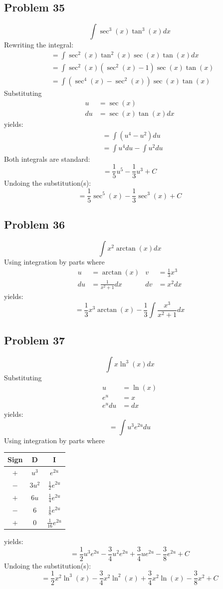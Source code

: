 \documentclass{article}
\begin{document}
\subsection*{Problem 35}
$$\int\sec^3\left(x\right)\tan^3\left(x\right)dx$$
Rewriting the integral:
\begin{align*}
&=\int\sec^2(x)\tan^2(x)\sec(x)\tan(x)dx \\
&=\int\sec^2(x)(\sec^2(x)-1)\sec(x)\tan(x) \\
&=\int(\sec^4(x)-\sec^2(x))\sec(x)\tan(x)
\end{align*}
Substituting
\begin{align*}
u&=\sec(x) \\
du&=\sec(x)\tan(x)dx
\end{align*}
yields:
\begin{align*}
&=\int\left(u^4-u^2\right)du \\
&=\int u^4du-\int u^2du
\end{align*}
Both integrals are standard:
$$=\frac{1}{5}u^5-\frac{1}{3}u^3+C$$
Undoing the substitution(s):
$$=\frac{1}{5}\sec^5(x)-\frac{1}{3}\sec^3(x)+C$$
\subsection*{Problem 36}
$$\int x^2\arctan\left(x\right)dx$$
Using integration by parts where
\begin{align*}
u&=\arctan(x) &v&=\frac{1}{3}x^3 \\
du&=\frac{1}{x^2+1}dx &dv&=x^2dx
\end{align*}
yields:
$$=\frac{1}{3}x^3\arctan(x)-\frac{1}{3}\int\frac{x^3}{x^2+1}dx$$
\subsection*{Problem 37}
$$\int x\ln^3\left(x\right)dx$$
Substituting
\begin{align*}
u&=\ln(x) \\
e^u&=x \\
e^udu&=dx
\end{align*}
yields:
$$=\int u^3e^{2u}du$$
Using integration by parts where
\begin{center}
\begin{tabular}{ |c|c|c| } 
 \hline
 Sign & D & I \\
 \hline
 $+$ & $u^3$ & $e^{2u}$ \\ 
 $-$ & $3u^2$ & $\frac{1}{2}e^{2u}$ \\
 $+$ & $6u$ & $\frac{1}{4}e^{2u}$ \\
 $-$ & $6$ & $\frac{1}{8}e^{2u}$ \\
 $+$ & $0$ & $\frac{1}{16}e^{2u}$ \\
 \hline
\end{tabular}
\end{center}
yields:
$$=\frac{1}{2}u^3e^{2u}-\frac{3}{4}u^2e^{2u}+\frac{3}{4}ue^{2u}-\frac{3}{8}e^{2u}+C$$
Undoing the substitution(s):
$$=\frac{1}{2}x^2\ln^3(x)-\frac{3}{4}x^2\ln^2(x)+\frac{3}{4}x^2\ln(x)-\frac{3}{8}x^2+C$$
\end{document}
